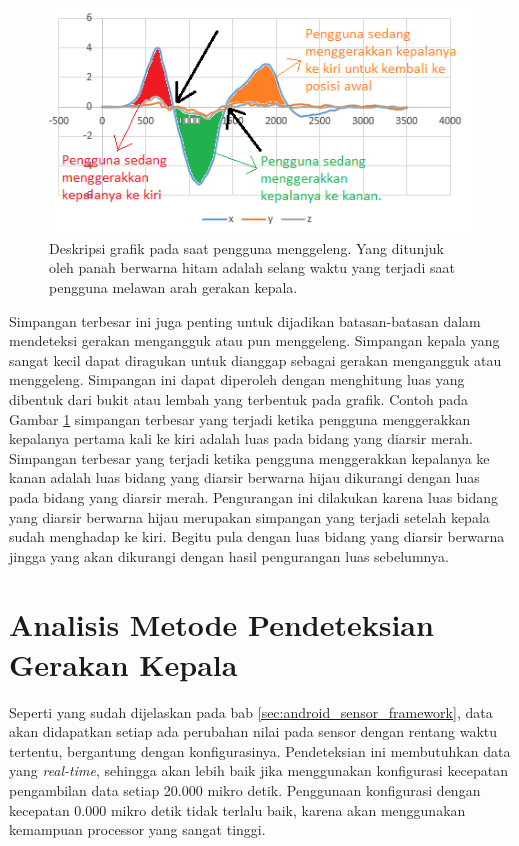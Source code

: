 \begin{figure}[htbp]
\centering
\includegraphics[scale=0.6]{Gambar/grafik-penjelasan-jarak-waktu-melawan-gerakan.png}
\caption{Deskripsi grafik pada saat pengguna menggeleng. Yang ditunjuk oleh panah berwarna hitam adalah selang waktu yang terjadi saat pengguna melawan arah gerakan kepala.} 
\label{fig:grafik-penjelasan-jarak-waktu-melawan-gerakan}
\end{figure}

Simpangan terbesar ini juga penting untuk dijadikan batasan-batasan dalam mendeteksi gerakan mengangguk atau pun menggeleng. Simpangan kepala yang sangat kecil dapat diragukan untuk dianggap sebagai gerakan mengangguk atau menggeleng. Simpangan ini dapat diperoleh dengan menghitung luas yang dibentuk dari bukit atau lembah yang terbentuk pada grafik. Contoh pada Gambar \ref{fig:grafik-penjelasan-jarak-waktu-melawan-gerakan} simpangan terbesar yang terjadi ketika pengguna menggerakkan kepalanya pertama kali ke kiri adalah luas pada bidang yang diarsir merah. Simpangan terbesar yang terjadi ketika pengguna menggerakkan kepalanya ke kanan adalah luas bidang yang diarsir berwarna hijau dikurangi dengan luas pada bidang yang diarsir merah. Pengurangan ini dilakukan karena luas bidang yang diarsir berwarna hijau merupakan simpangan yang terjadi setelah kepala sudah menghadap ke kiri. Begitu pula dengan luas bidang yang diarsir berwarna jingga yang akan dikurangi dengan hasil pengurangan luas sebelumnya.

\section{Analisis Metode Pendeteksian Gerakan Kepala}
\label{sec:analisis_metode_pendeteksi_gerakan_kepala}

Seperti yang sudah dijelaskan pada bab \ref{sec:android_sensor_framework}, data akan didapatkan setiap ada perubahan nilai pada sensor dengan rentang waktu tertentu, bergantung dengan konfigurasinya. Pendeteksian ini membutuhkan data yang \textit{real-time}, sehingga akan lebih baik jika menggunakan konfigurasi kecepatan pengambilan data setiap 20.000 mikro detik. Penggunaan konfigurasi dengan kecepatan 0.000 mikro detik tidak terlalu baik, karena akan menggunakan kemampuan processor yang sangat tinggi.

